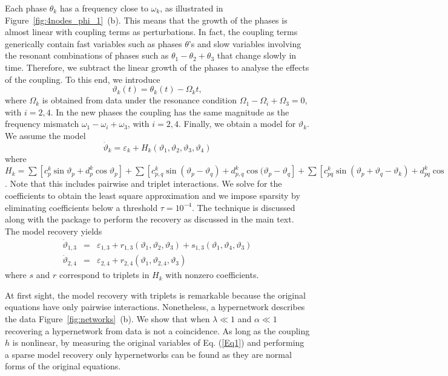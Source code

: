 \documentclass[12pt]{article}
\theoremstyle{plain}
\theoremstyle{definition}
\theoremstyle{remark}
\theoremstyle{remark}
\begin{document}
Each phase $\theta_k$  has a frequency close to   $\omega_k$, as illustrated in Figure~\ref{fig:4nodes_phi_1}~(b). This means that the growth of the phases  is almost linear with coupling terms as perturbations. 
%
In fact, the coupling terms generically contain fast variables such as phases $\theta$'s and slow variables involving the resonant combinations of phases such as $\theta_1 - \theta_2  + \theta_3$ that change slowly in time.
%
Therefore, we subtract the linear growth of the phases to analyse the effects of the coupling. To this end, we  introduce 
\begin{equation}\label{new_phases}
\vartheta_k(t) = \theta_k(t) - \Omega_k t, 
\end{equation} 
\noindent 
where $\Omega_k$ is obtained from data under the resonance condition $\Omega_1 -  \Omega_{i} +  \Omega_3 = 0$, with $i = 2,4$. In the new phases the coupling has the same magnitude as the frequency mismatch $\omega_1 - \omega_i + \omega_3$, with $i=2,4$. Finally,  we obtain a model for $\vartheta_k$.
We assume the model  
\[
\dot \vartheta_k = \varepsilon_k + H_k(\vartheta_1, \vartheta_2,\vartheta_3,\vartheta_4)
\]
\noindent
where $H_k = \sum [ c^k_p \sin \vartheta_p + d_p^k \cos \vartheta_p ]  + \sum [ c^k_{p,q} \sin (\vartheta_p - \vartheta_q) + d^k_{p,q} \cos (\vartheta_p - \vartheta_q ] 
+ \sum [ c^{k}_{pq} \sin (\vartheta_p + \vartheta_q - \vartheta_k) + d^{k}_{pq} \cos (\vartheta_p + \vartheta_q - \vartheta_k)] $. Note that this includes pairwise and triplet interactions. We solve for the coefficients to obtain the least square approximation and we impose sparsity by eliminating coefficients below a threshold $\tau = 10^{-4}$. The technique is discussed along with the package to perform the recovery as discussed in the main text.  The model recovery yields
\begin{eqnarray}
\label{recovered_eq}
\dot{\vartheta}_{1,3} &=& \varepsilon_{1,3} + r_{1,3}(\vartheta_1,\vartheta_2,\vartheta_3) + s_{1,3}(\vartheta_1,\vartheta_4, \vartheta_3) \\
\dot{\vartheta}_{2,4} &=&  \varepsilon_{2,4} + r_{2,4}(\vartheta_1,\vartheta_{2,4},\vartheta_3) \nonumber
\end{eqnarray}
where  $s$ and $r$ correspond to triplets in $H_k$ with nonzero coefficients. 

At first sight, the model recovery with triplets is remarkable because the original equations have only pairwise interactions. Nonetheless, a hypernetwork describes the data Figure~\ref{fig:networks}~(b). 
We show that when $\lambda \ll1$ and $\alpha \ll 1$  recovering a hypernetwork from data is  not a coincidence. As long as the coupling $h$ is nonlinear, by measuring the original variables of Eq. (\ref{Eq1}) and performing a sparse model recovery only hypernetworks can be found as they are normal forms of the original equations.
\end{document}
